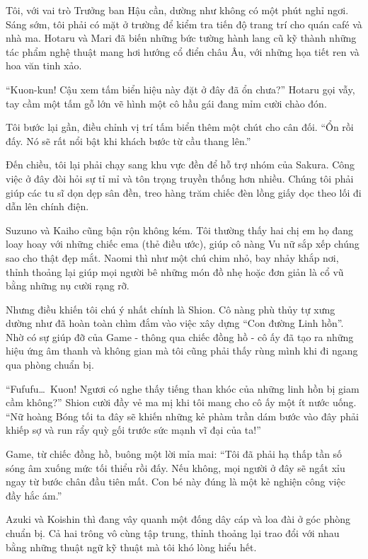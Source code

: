\documentclass[../main.tex]{subfiles}
\begin{document}
Tôi, với vai trò Trưởng ban Hậu cần, dường như không có một phút nghỉ ngơi. Sáng sớm, tôi phải có mặt ở trường để kiểm tra tiến độ trang trí cho quán café và nhà ma. Hotaru và Mari đã biến những bức tường hành lang cũ kỹ thành những tác phẩm nghệ thuật mang hơi hướng cổ điển châu Âu, với những họa tiết ren và hoa văn tinh xảo.

``Kuon-kun! Cậu xem tấm biển hiệu này đặt ở đây đã ổn chưa?'' Hotaru gọi vẫy, tay cầm một tấm gỗ lớn vẽ hình một cô hầu gái đang mỉm cười chào đón.

Tôi bước lại gần, điều chỉnh vị trí tấm biển thêm một chút cho cân đối. ``Ổn rồi đấy. Nó sẽ rất nổi bật khi khách bước từ cầu thang lên.''

Đến chiều, tôi lại phải chạy sang khu vực đền để hỗ trợ nhóm của Sakura. Công việc ở đây đòi hỏi sự tỉ mỉ và tôn trọng truyền thống hơn nhiều. Chúng tôi phải giúp các tu sĩ dọn dẹp sân đền, treo hàng trăm chiếc đèn lồng giấy dọc theo lối đi dẫn lên chính điện.

Suzuno và Kaiho cũng bận rộn không kém. Tôi thường thấy hai chị em họ đang loay hoay với những chiếc ema (thẻ điều ước), giúp cô nàng Vu nữ sắp xếp chúng sao cho thật đẹp mắt. Naomi thì như một chú chim nhỏ, bay nhảy khắp nơi, thỉnh thoảng lại giúp mọi người bê những món đồ nhẹ hoặc đơn giản là cổ vũ bằng những nụ cười rạng rỡ.

Nhưng điều khiến tôi chú ý nhất chính là Shion. Cô nàng phù thủy tự xưng dường như đã hoàn toàn chìm đắm vào việc xây dựng ``Con đường Linh hồn''. Nhờ có sự giúp đỡ của Game - thông qua chiếc đồng hồ - cô ấy đã tạo ra những hiệu ứng âm thanh và không gian mà tôi cũng phải thấy rùng mình khi đi ngang qua phòng chuẩn bị.

``Fufufu\dots\ Kuon! Ngươi có nghe thấy tiếng than khóc của những linh hồn bị giam cầm không?'' Shion cười đầy vẻ ma mị khi tôi mang cho cô ấy một ít nước uống. ``Nữ hoàng Bóng tối ta đây sẽ khiến những kẻ phàm trần dám bước vào đây phải khiếp sợ và run rẩy quỳ gối trước sức mạnh vĩ đại của ta!''

Game, từ chiếc đồng hồ, buông một lời mỉa mai: ``Tôi đã phải hạ thấp tần số sóng âm xuống mức tối thiểu rồi đấy. Nếu không, mọi người ở đây sẽ ngất xỉu ngay từ bước chân đầu tiên mất. Con bé này đúng là một kẻ nghiện công việc đầy hắc ám.''


Azuki và Koishin thì đang vây quanh một đống dây cáp và loa đài ở góc phòng chuẩn bị. Cả hai trông vô cùng tập trung, thỉnh thoảng lại trao đổi với nhau bằng những thuật ngữ kỹ thuật mà tôi khó lòng hiểu hết.
\end{document}
